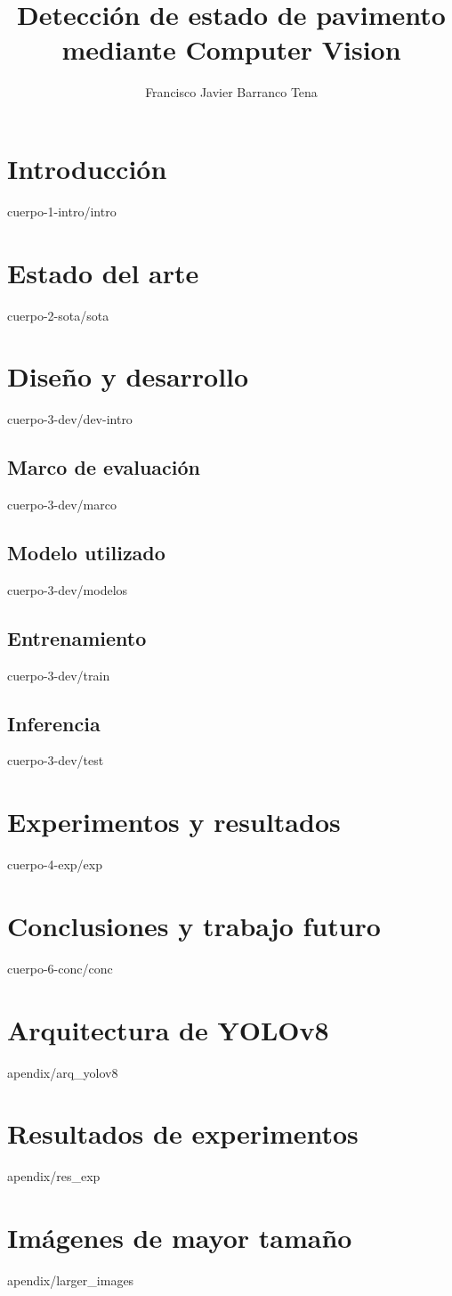 \documentclass[epsbased,copyright,final,printable,covers,extendedindex,firstnumbered,tfg,gnuplot]{tfgtfmthesisuam}
\title{Detección de estado de pavimento mediante Computer Vision}
\subtitle{}
\author{Francisco Javier Barranco Tena}
\begin{document}
\chapter{Introducción\label{CAP:INTRO}}{cuerpo-1-intro/intro}

\chapter{Estado del arte\label{CAP:SOTA}}{cuerpo-2-sota/sota}

\chapter{Diseño y desarrollo\label{CAP:DEV}}{cuerpo-3-dev/dev-intro}
  \section{Marco de evaluación\label{SEC:MARCO}}{cuerpo-3-dev/marco}
  \section{Modelo utilizado\label{SEC:MODELOS}}{cuerpo-3-dev/modelos}
  \section{Entrenamiento\label{SEC:TRAIN}}{cuerpo-3-dev/train}
  \section{Inferencia\label{SEC:PRED}}{cuerpo-3-dev/test}
  
\chapter{Experimentos y resultados\label{CAP:EXP}}{cuerpo-4-exp/exp}

\chapter{Conclusiones y trabajo futuro\label{CAP:CONC}}{cuerpo-6-conc/conc}



\appendix
\chapter{Arquitectura de YOLOv8\label{CAP:ARQ_YOLO}}{apendix/arq_yolov8}
\chapter{Resultados de experimentos\label{CAP:RES_EXP}}{apendix/res_exp}
\chapter{Imágenes de mayor tamaño\label{CAP:IMAGENES}}{apendix/larger_images}
\end{document}
